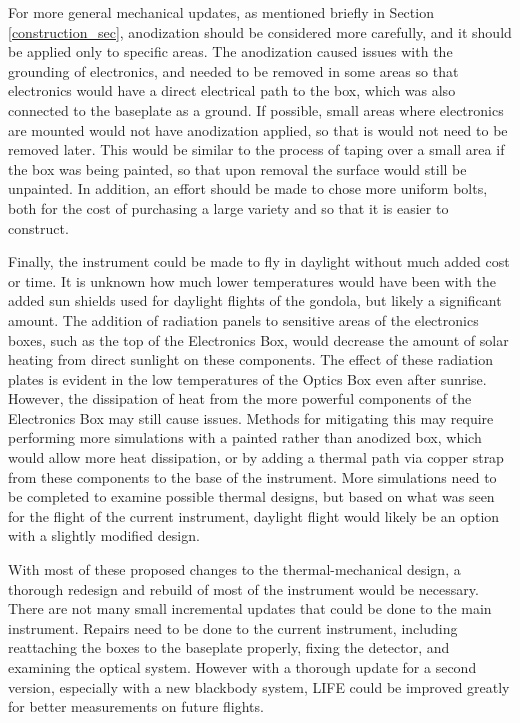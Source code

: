 For more general mechanical updates, as mentioned briefly in Section \ref{construction_sec}, anodization should be considered more carefully, and it should be applied only to specific areas. The anodization caused issues with the grounding of electronics, and needed to be removed in some areas so that electronics would have a direct electrical path to the box, which was also connected to the baseplate as a ground. If possible, small areas where electronics are mounted would not have anodization applied, so that is would not need to be removed later. This would be similar to the process of taping over a small area if the box was being painted, so that upon removal the surface would still be unpainted. In addition, an effort should be made to chose more uniform bolts, both for the cost of purchasing a large variety and so that it is easier to construct.

Finally, the instrument could be made to fly in daylight without much added cost or time. It is unknown how much lower temperatures would have been with the added sun shields used for daylight flights of the gondola, but likely a significant amount. The addition of radiation panels to sensitive areas of the electronics boxes, such as the top of the Electronics Box, would decrease the amount of solar heating from direct sunlight on these components. The effect of these radiation plates is evident in the low temperatures of the Optics Box even after sunrise. However, the dissipation of heat from the more powerful components of the Electronics Box may still cause issues. Methods for mitigating this may require performing more simulations with a painted rather than anodized box, which would allow more heat dissipation, or by adding a thermal path via copper strap from these components to the base of the instrument. More simulations need to be completed to examine possible thermal designs, but based on what was seen for the flight of the current instrument, daylight flight would likely be an option with a slightly modified design.

With most of these proposed changes to the thermal-mechanical design, a thorough redesign and rebuild of most of the instrument would be necessary. There are not many small incremental updates that could be done to the main instrument. Repairs need to be done to the current instrument, including reattaching the boxes to the baseplate properly, fixing the detector, and examining the optical system. However with a thorough update for a second version, especially with a new blackbody system, LIFE could be improved greatly for better measurements on future flights.

